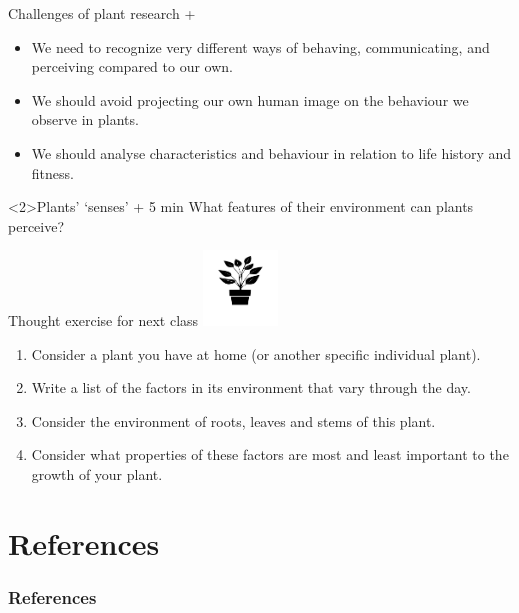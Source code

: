 \documentclass[10pt]{beamer}
\begin{document}
\begin{frame}{Challenges of plant research + \Discussion}

\begin{itemize}
    \item<1-2> We need to recognize very different ways of behaving, communicating, and perceiving compared to our own.
    \item<1-2> We should avoid projecting our own human image on the behaviour we observe in plants.
    \item<1-2> We should analyse characteristics and behaviour in relation to life history and fitness.
\end{itemize}

\begin{alertblock}<2>{Plants' `senses'  + 5 min}
  \vspace{0.5ex}
  What features of their environment can plants perceive?\\
\end{alertblock}

\end{frame}

\begin{frame}{\HomeWork Thought exercise for next class}
\includegraphics[width=2cm]{figures/icons-svg/noun-plant-1358991.png}
\begin{enumerate}
  \item Consider a plant you have at home (or another specific individual plant).
  \item Write a list of the factors in its environment that vary through the day.
  \item Consider the environment of roots, leaves and stems of this plant.
  \item Consider what properties of these factors are most and least important to the growth of your plant.
\end{enumerate}
\end{frame}

\nocite{Chamovitz2017,Denison2012,Karban2015,Keddy2017,Manetas2012}
\nocite{Sadras2021,Sadras2014a}
\section*{References}
  \begin{frame}[t,allowframebreaks]
    \frametitle{References}
    \printbibliography
  \end{frame}
\end{document}
